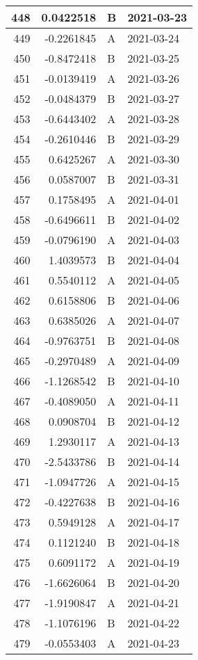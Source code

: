 \begin{tabular}{r|r|l|l}
\hline
448 & 0.0422518 & B & 2021-03-23\\
\hline
449 & -0.2261845 & A & 2021-03-24\\
\hline
450 & -0.8472418 & B & 2021-03-25\\
\hline
451 & -0.0139419 & A & 2021-03-26\\
\hline
452 & -0.0484379 & B & 2021-03-27\\
\hline
453 & -0.6443402 & A & 2021-03-28\\
\hline
454 & -0.2610446 & B & 2021-03-29\\
\hline
455 & 0.6425267 & A & 2021-03-30\\
\hline
456 & 0.0587007 & B & 2021-03-31\\
\hline
457 & 0.1758495 & A & 2021-04-01\\
\hline
458 & -0.6496611 & B & 2021-04-02\\
\hline
459 & -0.0796190 & A & 2021-04-03\\
\hline
460 & 1.4039573 & B & 2021-04-04\\
\hline
461 & 0.5540112 & A & 2021-04-05\\
\hline
462 & 0.6158806 & B & 2021-04-06\\
\hline
463 & 0.6385026 & A & 2021-04-07\\
\hline
464 & -0.9763751 & B & 2021-04-08\\
\hline
465 & -0.2970489 & A & 2021-04-09\\
\hline
466 & -1.1268542 & B & 2021-04-10\\
\hline
467 & -0.4089050 & A & 2021-04-11\\
\hline
468 & 0.0908704 & B & 2021-04-12\\
\hline
469 & 1.2930117 & A & 2021-04-13\\
\hline
470 & -2.5433786 & B & 2021-04-14\\
\hline
471 & -1.0947726 & A & 2021-04-15\\
\hline
472 & -0.4227638 & B & 2021-04-16\\
\hline
473 & 0.5949128 & A & 2021-04-17\\
\hline
474 & 0.1121240 & B & 2021-04-18\\
\hline
475 & 0.6091172 & A & 2021-04-19\\
\hline
476 & -1.6626064 & B & 2021-04-20\\
\hline
477 & -1.9190847 & A & 2021-04-21\\
\hline
478 & -1.1076196 & B & 2021-04-22\\
\hline
479 & -0.0553403 & A & 2021-04-23\\

\end{tabular}
